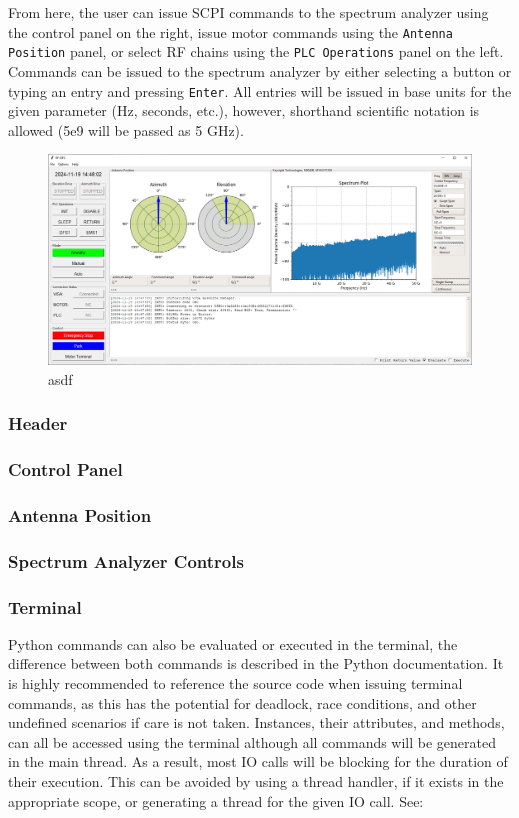 \documentclass[titlepage]{article}
\begin{document}
From here, the user can issue SCPI commands to the spectrum analyzer using the control panel on the right, issue motor commands using the \verb|Antenna Position| panel, or select RF chains using the \verb|PLC Operations| panel on the left. Commands can be issued to the spectrum analyzer by either selecting a button or typing an entry and pressing \verb|Enter|. All entries will be issued in base units for the given parameter (Hz, seconds, etc.), however, shorthand scientific notation is allowed (5e9 will be passed as 5 GHz).

\begin{figure}
  \begin{center}
    \includegraphics[width=\textwidth]{images/3gui.png}
  \end{center}
  \caption{asdf}\label{fig:gui}
\end{figure}

\subsubsection{Header}
\subsubsection{Control Panel}
\subsubsection{Antenna Position}
\subsubsection{Spectrum Analyzer Controls}
\subsubsection{Terminal}
Python commands can also be evaluated or executed in the terminal, the difference between both commands is described in the Python documentation. It is highly recommended to reference the source code when issuing terminal commands, as this has the potential for deadlock, race conditions, and other undefined scenarios if care is not taken. Instances, their attributes, and methods, can all be accessed using the terminal although all commands will be generated in the main thread. As a result, most IO calls will be blocking for the duration of their execution. This can be avoided by using a thread handler, if it exists in the appropriate scope, or generating a thread for the given IO call. See:
\end{document}
